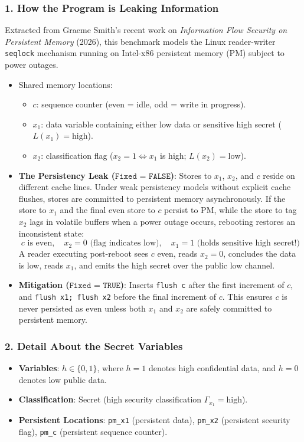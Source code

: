 \documentclass[a4paper,11pt]{article}
\begin{document}
\subsubsection{1. How the Program is Leaking Information}
Extracted from Graeme Smith's recent work on \emph{Information Flow Security on Persistent Memory} (2026), this benchmark models the Linux reader-writer \texttt{seqlock} mechanism running on Intel-x86 persistent memory (PM) subject to power outages.
\begin{itemize}
    \item Shared memory locations:
    \begin{itemize}
        \item $c$: sequence counter (even = idle, odd = write in progress).
        \item $x_1$: data variable containing either low data or sensitive high secret ($L(x_1) = \text{high}$).
        \item $x_2$: classification flag ($x_2 = 1 \iff x_1$ is high; $L(x_2) = \text{low}$).
    \end{itemize}
    \item \textbf{The Persistency Leak ($\texttt{Fixed = FALSE}$)}:
    Stores to $x_1$, $x_2$, and $c$ reside on different cache lines. Under weak persistency models without explicit cache flushes, stores are committed to persistent memory asynchronously.
    If the store to $x_1$ and the final even store to $c$ persist to PM, while the store to tag $x_2$ lags in volatile buffers when a power outage occurs, rebooting restores an inconsistent state:
    $$c \text{ is even}, \quad x_2 = 0 \text{ (flag indicates low)}, \quad x_1 = 1 \text{ (holds sensitive high secret!)}$$
    A reader executing post-reboot sees $c$ even, reads $x_2 = 0$, concludes the data is low, reads $x_1$, and emits the high secret over the public low channel.
    \item \textbf{Mitigation ($\texttt{Fixed = TRUE}$)}:
    Inserts \texttt{flush c} after the first increment of $c$, and \texttt{flush x1; flush x2} before the final increment of $c$. This ensures $c$ is never persisted as even unless both $x_1$ and $x_2$ are safely committed to persistent memory.
\end{itemize}

\subsubsection{2. Detail About the Secret Variables}
\begin{itemize}
    \item \textbf{Variables}: $h \in \{0, 1\}$, where $h = 1$ denotes high confidential data, and $h = 0$ denotes low public data.
    \item \textbf{Classification}: Secret (high security classification $\Gamma_{x_1} = \text{high}$).
    \item \textbf{Persistent Locations}: \texttt{pm\_x1} (persistent data), \texttt{pm\_x2} (persistent security flag), \texttt{pm\_c} (persistent sequence counter).
\end{itemize}
\end{document}
